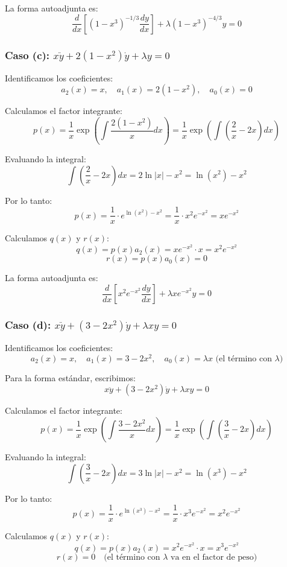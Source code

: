\documentclass[a4paper]{article}
\begin{document}
La forma autoadjunta es:
$$
\boxed{\frac{d}{dx}\left[(1 - x^3)^{-1/3}\frac{dy}{dx}\right] + \lambda(1 - x^3)^{-4/3}y = 0}
$$

\subsubsection{Caso (c): $x\ddot{y} + 2(1 - x^2)\dot{y} + \lambda y = 0$}

Identificamos los coeficientes:
$$
a_2(x) = x, \quad a_1(x) = 2(1 - x^2), \quad a_0(x) = 0
$$

Calculamos el factor integrante:
$$
p(x) = \frac{1}{x} \exp\left(\int \frac{2(1 - x^2)}{x} dx\right) = \frac{1}{x} \exp\left(\int \left(\frac{2}{x} - 2x\right) dx\right)
$$

Evaluando la integral:
$$
\int \left(\frac{2}{x} - 2x\right) dx = 2\ln|x| - x^2 = \ln(x^2) - x^2
$$

Por lo tanto:
$$
p(x) = \frac{1}{x} \cdot e^{\ln(x^2) - x^2} = \frac{1}{x} \cdot x^2 e^{-x^2} = x e^{-x^2}
$$

Calculamos $q(x)$ y $r(x)$:
$$
q(x) = p(x)a_2(x) = x e^{-x^2} \cdot x = x^2 e^{-x^2}
$$
$$
r(x) = p(x)a_0(x) = 0
$$

La forma autoadjunta es:
$$
\boxed{\frac{d}{dx}\left[x^2 e^{-x^2}\frac{dy}{dx}\right] + \lambda x e^{-x^2}y = 0}
$$

\subsubsection{Caso (d): $x\ddot{y} + (3 - 2x^2)\dot{y} + \lambda xy = 0$}

Identificamos los coeficientes:
$$
a_2(x) = x, \quad a_1(x) = 3 - 2x^2, \quad a_0(x) = \lambda x \text{ (el término con $\lambda$)}
$$

Para la forma estándar, escribimos:
$$
x\ddot{y} + (3 - 2x^2)\dot{y} + \lambda xy = 0
$$

Calculamos el factor integrante:
$$
p(x) = \frac{1}{x} \exp\left(\int \frac{3 - 2x^2}{x} dx\right) = \frac{1}{x} \exp\left(\int \left(\frac{3}{x} - 2x\right) dx\right)
$$

Evaluando la integral:
$$
\int \left(\frac{3}{x} - 2x\right) dx = 3\ln|x| - x^2 = \ln(x^3) - x^2
$$

Por lo tanto:
$$
p(x) = \frac{1}{x} \cdot e^{\ln(x^3) - x^2} = \frac{1}{x} \cdot x^3 e^{-x^2} = x^2 e^{-x^2}
$$

Calculamos $q(x)$ y $r(x)$:
$$
q(x) = p(x)a_2(x) = x^2 e^{-x^2} \cdot x = x^3 e^{-x^2}
$$
$$
r(x) = 0 \quad \text{(el término con $\lambda$ va en el factor de peso)}
$$
\end{document}
